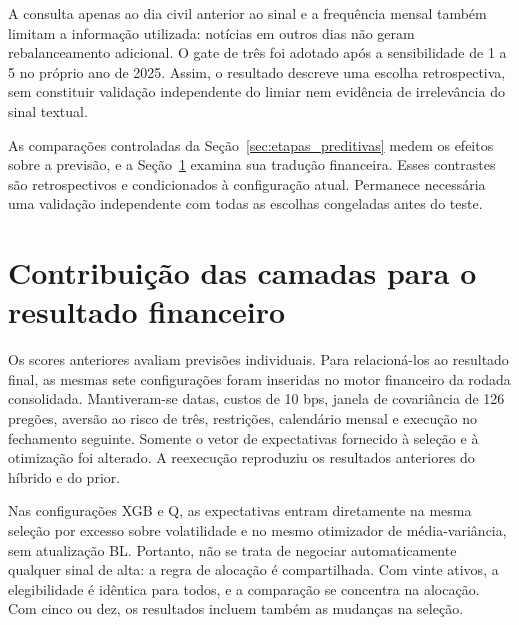 A consulta apenas ao dia civil anterior ao sinal e a frequência mensal também limitam a informação utilizada: notícias em outros dias não geram rebalanceamento adicional. O gate de três foi adotado após a sensibilidade de 1 a 5 no próprio ano de 2025. Assim, o resultado descreve uma escolha retrospectiva, sem constituir validação independente do limiar nem evidência de irrelevância do sinal textual.

As comparações controladas da Seção~\ref{sec:etapas_preditivas} medem os efeitos sobre a previsão, e a Seção~\ref{sec:atribuicao_financeira} examina sua tradução financeira. Esses contrastes são retrospectivos e condicionados à configuração atual. Permanece necessária uma validação independente com todas as escolhas congeladas antes do teste.

\section{Contribuição das camadas para o resultado financeiro}

\label{sec:atribuicao_financeira}

Os scores anteriores avaliam previsões individuais. Para relacioná-los ao resultado final, as mesmas sete configurações foram inseridas no motor financeiro da rodada consolidada. Mantiveram-se datas, custos de 10 bps, janela de covariância de 126 pregões, aversão ao risco de três, restrições, calendário mensal e execução no fechamento seguinte. Somente o vetor de expectativas fornecido à seleção e à otimização foi alterado. A reexecução reproduziu os resultados anteriores do híbrido e do prior.

Nas configurações XGB e Q, as expectativas entram diretamente na mesma seleção por excesso sobre volatilidade e no mesmo otimizador de média-variância, sem atualização BL. Portanto, não se trata de negociar automaticamente qualquer sinal de alta: a regra de alocação é compartilhada. Com vinte ativos, a elegibilidade é idêntica para todos, e a comparação se concentra na alocação. Com cinco ou dez, os resultados incluem também as mudanças na seleção.

